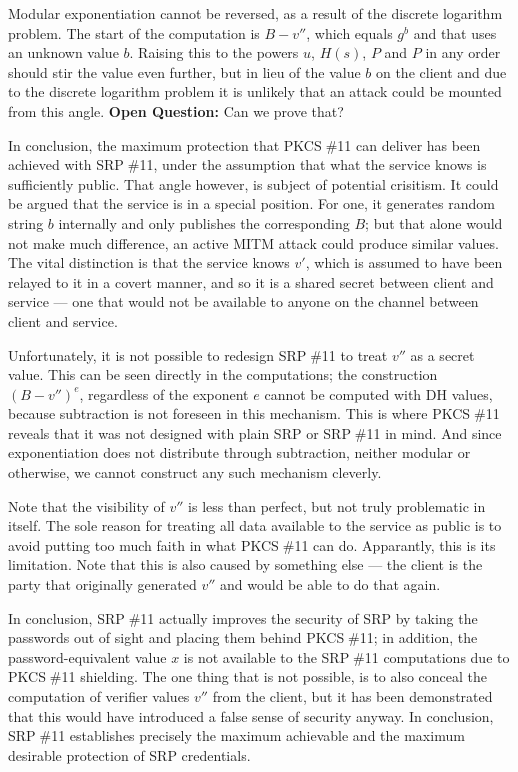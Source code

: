 \documentclass[a4paper,11pt]{article}
\def\pkcs11{PKCS$\;$\#11\xspace}
\def\srp11{SRP$\;$\#11\xspace}
\begin{document}
Modular exponentiation cannot be reversed, as a result of the discrete logarithm problem.  The start of the computation is $B-v''$, which equals $g^b$ and that uses an unknown value $b$.  Raising this to the powers $u$, $H(s)$, $P$ and $P$ in any order should stir the value even further, but in lieu of the value $b$ on the client and due to the discrete logarithm problem it is unlikely that an attack could be mounted from this angle.  \textbf{Open Question:} Can we prove that?

In conclusion, the maximum protection that \pkcs11 can deliver has been achieved with \srp11, under the assumption that what the service knows is sufficiently public.  That angle however, is subject of potential crisitism.  It could be argued that the service is in a special position.  For one, it generates random string $b$ internally and only publishes the corresponding $B$; but that alone would not make much difference, an active MITM attack could produce similar values. The vital distinction is that the service knows $v'$, which is assumed to have been relayed to it in a covert manner, and so it is a shared secret between client and service --- one that would not be available to anyone on the channel between client and service.

Unfortunately, it is not possible to redesign \srp11 to treat $v''$ as a secret value.  This can be seen directly in the computations; the construction $(B-v'')^e$, regardless of the exponent $e$ cannot be computed with DH values, because subtraction is not foreseen in this mechanism.  This is where \pkcs11 reveals that it was not designed with plain SRP or \srp11 in mind.  And since exponentiation does not distribute through subtraction, neither modular or otherwise, we cannot construct any such mechanism cleverly.

Note that the visibility of $v''$ is less than perfect, but not truly problematic in itself.  The sole reason for treating all data available to the service as public is to avoid putting too much faith in what \pkcs11 can do.  Apparantly, this is its limitation.  Note that this is also caused by something else --- the client is the party that originally generated $v''$ and would be able to do that again.

In conclusion, \srp11 actually improves the security of SRP by taking the passwords out of sight and placing them behind \pkcs11; in addition, the password-equivalent value $x$ is not available to the \srp11 computations due to \pkcs11 shielding.  The one thing that is not possible, is to also conceal the computation of verifier values $v''$ from the client, but it has been demonstrated that this would have introduced a false sense of security anyway.  In conclusion, \srp11 establishes precisely the maximum achievable and the maximum desirable protection of SRP credentials.
\end{document}

